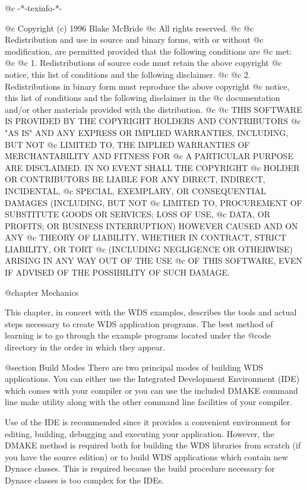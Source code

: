 @c -*-texinfo-*-

@c  Copyright (c) 1996 Blake McBride
@c  All rights reserved.
@c
@c  Redistribution and use in source and binary forms, with or without
@c  modification, are permitted provided that the following conditions are
@c  met:
@c
@c  1. Redistributions of source code must retain the above copyright
@c  notice, this list of conditions and the following disclaimer.
@c
@c  2. Redistributions in binary form must reproduce the above copyright
@c  notice, this list of conditions and the following disclaimer in the
@c  documentation and/or other materials provided with the distribution.
@c
@c  THIS SOFTWARE IS PROVIDED BY THE COPYRIGHT HOLDERS AND CONTRIBUTORS
@c  "AS IS" AND ANY EXPRESS OR IMPLIED WARRANTIES, INCLUDING, BUT NOT
@c  LIMITED TO, THE IMPLIED WARRANTIES OF MERCHANTABILITY AND FITNESS FOR
@c  A PARTICULAR PURPOSE ARE DISCLAIMED. IN NO EVENT SHALL THE COPYRIGHT
@c  HOLDER OR CONTRIBUTORS BE LIABLE FOR ANY DIRECT, INDIRECT, INCIDENTAL,
@c  SPECIAL, EXEMPLARY, OR CONSEQUENTIAL DAMAGES (INCLUDING, BUT NOT
@c  LIMITED TO, PROCUREMENT OF SUBSTITUTE GOODS OR SERVICES; LOSS OF USE,
@c  DATA, OR PROFITS; OR BUSINESS INTERRUPTION) HOWEVER CAUSED AND ON ANY
@c  THEORY OF LIABILITY, WHETHER IN CONTRACT, STRICT LIABILITY, OR TORT
@c  (INCLUDING NEGLIGENCE OR OTHERWISE) ARISING IN ANY WAY OUT OF THE USE
@c  OF THIS SOFTWARE, EVEN IF ADVISED OF THE POSSIBILITY OF SUCH DAMAGE.

@chapter Mechanics

This chapter, in concert with the WDS examples, describes the tools and
actual steps necessary to create WDS application programs.  The best
method of learning is to go through the example programs located under
the @code{\DYNACE\WINEXAM} directory in the order in which they appear.

@section Build Modes
There are two principal modes of building WDS applications.  You can
either use the Integrated Development Environment (IDE) which comes
with your compiler or you can use the included DMAKE command line
make utility along with the other command line facilities of your
compiler.

Use of the IDE is recommended since it provides a convenient environment
for editing, building, debugging and executing your application.  However,
the DMAKE method is required both for building the WDS libraries from
scratch (if you have the source edition) or to build WDS applications
which contain new Dynace classes.  This is required because the build
procedure necessary for Dynace classes is too complex for the IDEs.

